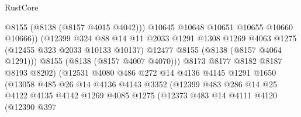\begin{lexlean}{RustCore}
\begin{coremodule}
                                      @8155
                                      (@8138 (@8157 @4015 @4042)))
                                    @10645
                                    @10648
                                    @10651
                                    @10655
                                    @10660
                                    @10666))
                                (@12399
                                  @324
                                  @88
                                  @14
                                  @11
                                  @2033
                                  @1291
                                  @1308
                                  @1269
                                  @4063
                                  @1275
                                  (@12455 @323 @2033 @10133 @10137)
                                  @12477
                                  @8155
                                  (@8138 (@8157 @4064 @1291)))
                                @8155
                                (@8138 (@8157 @4007 @4070)))
                              @8173
                              @8177
                              @8182
                              @8187
                              @8193
                              @8202)
                            (@12531
                              @4080
                              @486
                              @272
                              @14
                              @4136
                              @4145
                              @1291
                              @1650
                              (@13058
                                @485
                                @26
                                @14
                                @4136
                                @4143
                                @3352
                                (@12399
                                  @483
                                  @286
                                  @14
                                  @25
                                  @4122
                                  @4135
                                  @4142
                                  @1269
                                  @4085
                                  @1275
                                  (@12373
                                    @483
                                    @14
                                    @4111
                                    @4120
                                    (@12390
                                      @397

\end{coremodule}
\end{lexlean}
